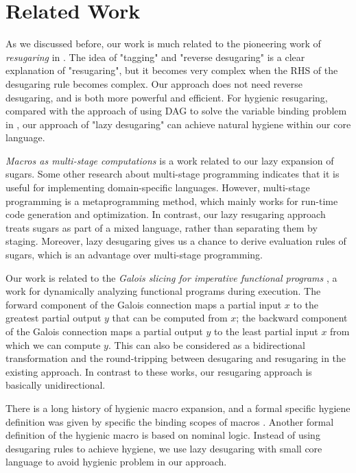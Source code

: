 \section{Related Work}
\label{sec6}

As we discussed before, our work is much related to the pioneering work of \emph{resugaring} in \cite{resugaring}. The idea of "tagging" and "reverse desugaring" is a clear explanation of "resugaring", but it becomes very complex when the RHS of the desugaring rule becomes complex. Our approach does not need reverse desugaring, and is both more powerful and efficient.
For hygienic resugaring, compared with the approach of using DAG to solve the variable binding problem in \cite{hygienic}, our approach of "lazy desugaring" can achieve natural hygiene within our core language.

\emph{Macros as multi-stage computations} \cite{multistage} is a work related to our lazy expansion of sugars. Some other research \cite{modularstaging} about multi-stage programming \cite{MSP} indicates that it is useful for implementing domain-specific languages. However, multi-stage programming is a metaprogramming method, which mainly works for run-time code generation and optimization. In contrast, our lazy resugaring approach treats sugars as part of a mixed language, rather than separating them by staging. Moreover, lazy desugaring gives us a chance to derive evaluation rules of sugars, which is an advantage over multi-stage programming.

Our work is related to the \emph{Galois slicing for imperative functional programs} \cite{slicing}, a work for dynamically analyzing functional programs during execution. The forward component of the Galois connection maps a partial input $x$ to the greatest partial output $y$ that can be computed from $x$; the backward component of the Galois connection maps a partial output $y$ to the least partial input $x$ from which we can compute $y$.
This can also be considered as a bidirectional transformation \cite{bx,lens07} and the round-tripping between desugaring and resugaring in the existing approach. In contrast to these works, our resugaring approach is basically unidirectional. 


There is a long history of hygienic macro expansion\cite{hygienicmacro}, and a formal specific hygiene definition was given by specific the binding scopes of macros \cite{10.5555/1792878.1792884}. Another formal definition of the hygienic macro\cite{EssenceofHygiene} is based on nominal logic\cite{10.1007/s001650200016}. Instead of using desugaring rules to achieve hygiene, we use lazy desugaring with small core language to avoid hygienic problem in our approach.
%

